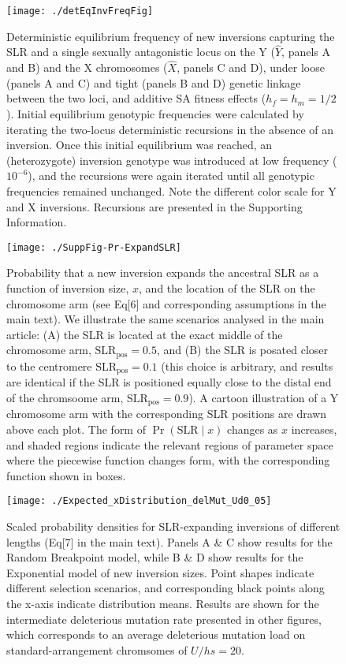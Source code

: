 \documentclass{article}
\begin{document}
\begin{appendices}
\newpage
 \begin{figure}[H]
 \centering
 \texttt{[image: ./detEqInvFreqFig]}
 \caption{Deterministic equilibrium frequency of new inversions capturing the SLR and a single sexually antagonistic locus on the Y ($\hat{Y}$, panels A and B) and the X chromosomes ($\hat{X}$, panels C and D), under loose (panels A and C) and tight (panels B and D) genetic linkage between the two loci, and additive SA fitness effects ($h_f = h_m = 1/2$). Initial equilibrium genotypic frequencies were calculated by iterating the two-locus deterministic recursions in the absence of an inversion. Once this initial equilibrium was reached, an (heterozygote) inversion genotype was introduced at low frequency ($10^{-6}$), and the recursions were again iterated until all genotypic frequencies remained unchanged. Note the different color scale for Y and X inversions. Recursions are presented in the Supporting Information.}
 \label{fig:detInvFreqSA}
 \end{figure}


\newpage
\begin{figure}[H]
 \centering
 \texttt{[image: ./SuppFig-Pr-ExpandSLR]}
 \caption{Probability that a new inversion expands the ancestral SLR as a function of inversion size, $x$, and the location of the SLR on the chromosome arm (see Eq[6] and corresponding assumptions in the main text). We illustrate the same scenarios analysed in the main article: (A) the SLR is located at the exact middle of the chromosome arm, $\text{SLR}_\text{pos} = 0.5$, and (B) the SLR is posated closer to the centromere $\text{SLR}_\text{pos} = 0.1$ (this choice is arbitrary, and results are identical if the SLR is positioned equally close to the distal end of the chromsoome arm, $\text{SLR}_\text{pos} = 0.9$). A cartoon illustration of a Y chromosome arm with the corresponding SLR positions are drawn above each plot. The form of $\Pr (\text{SLR} \mid x)$ changes as $x$ increases, and shaded regions indicate the relevant regions of parameter space where the piecewise function changes form, with the corresponding function shown in boxes.}
 \label{fig:ExpandSLR-SuppFig}
 \end{figure}


\newpage
 \begin{figure}[H]
 \centering
 \texttt{[image: ./Expected\_xDistribution\_delMut\_Ud0\_05]}
 \caption{Scaled probability densities for SLR-expanding inversions of different lengths (Eq[7] in the main text). Panels A \& C show results for the Random Breakpoint model, while B \& D show results for the Exponential model of new inversion sizes. Point shapes indicate different selection scenarios, and corresponding black points along the x-axis indicate distribution means. Results are shown for the intermediate deleterious mutation rate presented in other figures, which corresponds to an average deleterious mutation load on standard-arrangement chromsomes of $U/hs = 20$. }
 \label{fig:ExpectedDistFig_Ud0_05}
 \end{figure}



\end{appendices}
\end{document}
